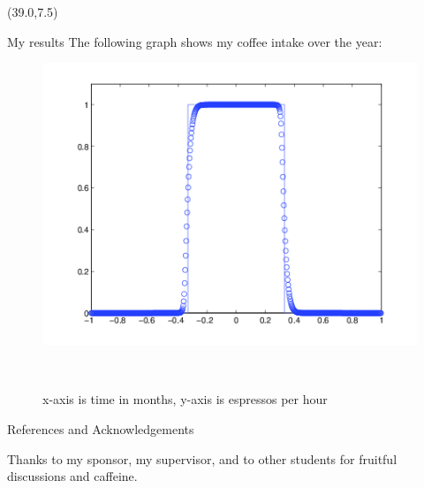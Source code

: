 \documentclass[final]{beamer}
\begin{document}
\begin{frame}{}
\begin{textblock}{19.0}(39.0,7.5)
\begin{block}{My results}
The following graph shows my coffee intake over the year:\\
\begin{figure}
\begin{minipage}{0.95\linewidth}
\includegraphics[width = \linewidth]{ENOTest3b.png}
\end{minipage}\\
\begin{minipage}{0.95\linewidth}
\caption{x-axis is time in months, y-axis is espressos per hour}
\label{fig:CoffeeFig}
\end{minipage}
\end{figure}
\end{block}

\begin{block}{References and Acknowledgements}
\begin{minipage}{0.9\linewidth}
     {     \printbibliography   %
     } 
\end{minipage}
\vspace{2ex}
Thanks to my sponsor, my supervisor, and to other students for
  fruitful discussions and caffeine.
\end{block}

\end{textblock}

\end{frame}
\end{document}
